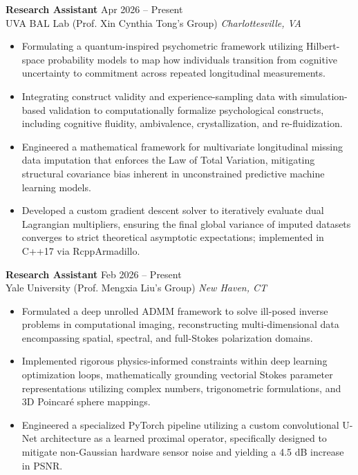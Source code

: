 \documentclass[11pt, letterpaper]{article}
\newenvironment{cvitemize}{
    \begin{itemize}[leftmargin=0.2in, label={\textbullet}, itemsep=4pt, parsep=0pt, topsep=4pt]
}{
    \end{itemize}
}
\newcommand{\cvheading}[4]{
    \vspace{4pt}
    \noindent\textbf{#1} \hfill #2 \\
    #3 \hfill \textit{#4} \vspace{2pt}
}
\begin{document}
\cvheading{Research Assistant}{Apr 2026 -- Present}{UVA BAL Lab (Prof. Xin Cynthia Tong's Group)}{Charlottesville, VA}
\begin{cvitemize}
    \item Formulating a quantum-inspired psychometric framework utilizing Hilbert-space probability models to map how individuals transition from cognitive uncertainty to commitment across repeated longitudinal measurements.
    \item Integrating construct validity and experience-sampling data with simulation-based validation to computationally formalize psychological constructs, including cognitive fluidity, ambivalence, crystallization, and re-fluidization.
    \item Engineered a mathematical framework for multivariate longitudinal missing data imputation that enforces the Law of Total Variation, mitigating structural covariance bias inherent in unconstrained predictive machine learning models.
    \item Developed a custom gradient descent solver to iteratively evaluate dual Lagrangian multipliers, ensuring the final global variance of imputed datasets converges to strict theoretical asymptotic expectations; implemented in C++17 via RcppArmadillo.
\end{cvitemize}

\cvheading{Research Assistant}{Feb 2026 -- Present}{Yale University (Prof. Mengxia Liu's Group)}{New Haven, CT}
\begin{cvitemize}
    \item Formulated a deep unrolled ADMM framework to solve ill-posed inverse problems in computational imaging, reconstructing multi-dimensional data encompassing spatial, spectral, and full-Stokes polarization domains.
    \item Implemented rigorous physics-informed constraints within deep learning optimization loops, mathematically grounding vectorial Stokes parameter representations utilizing complex numbers, trigonometric formulations, and 3D Poincaré sphere mappings.
    \item Engineered a specialized PyTorch pipeline utilizing a custom convolutional U-Net architecture as a learned proximal operator, specifically designed to mitigate non-Gaussian hardware sensor noise and yielding a 4.5 dB increase in PSNR.
\end{cvitemize}
\end{document}
